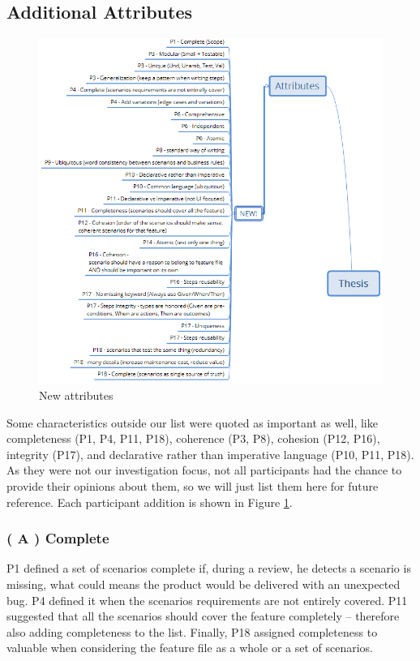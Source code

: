 
\subsection{\label{chap:added}Additional Attributes}

\begin{figure}[h]
	\centering
	\includegraphics[scale=0.8]{images/new_attribute}
	\caption[\hspace{2mm}New attributes]{New attributes}
	\label{fig:new_attribute}
\end{figure}

Some characteristics outside our list were quoted as important as well, like completeness (P1, P4, P11, P18), coherence (P3, P8), cohesion (P12, P16), integrity (P17), and declarative rather than imperative language (P10, P11, P18). As they were not our investigation focus, not all participants had the chance to provide their opinions about them, so we will just list them here for future reference. Each participant addition is shown in Figure \ref{fig:new_attribute}.

\subsubsection{\textbf{( A ) Complete}}
P1 defined a set of scenarios complete if, during a review, he detects a scenario is missing, what could means the product would be delivered with an unexpected bug. P4 defined it when the scenarios requirements are not entirely covered. P11 suggested that all the scenarios should cover the feature completely -- therefore also adding completeness to the list. Finally, P18 assigned completeness to valuable when considering the feature file as a whole or a set of scenarios. 

